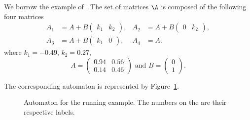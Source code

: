 
\begin{myexem}%
  \label{exem:run1}
  We borrow the example of \cite[]{philippe2016stability}.
  The set of matrices $\A$ is composed of the following four matrices
  \begin{align*}
    A_1 & = A+B
    \begin{pmatrix}
      k_1 & k_2
    \end{pmatrix},&
    A_2 & = A+B
    \begin{pmatrix}
      0 & k_2
    \end{pmatrix},\\
    A_3 & = A+B
    \begin{pmatrix}
      k_1 & 0
    \end{pmatrix},&
    A_4 & = A.
  \end{align*}
  where $k_1 = -0.49$, $k_2 = 0.27$,
  \[
    A =
    \begin{pmatrix}
      0.94 & 0.56\\
      0.14 & 0.46
    \end{pmatrix} \text{ and }
    B =
    \begin{pmatrix}
      0\\
      1
    \end{pmatrix}.
  \]

  The corresponding automaton is represented by Figure~\ref{fig:run}.

  \begin{figure}[!ht]
    \centering
     \caption{Automaton for the running example.
     The numbers on the \arcs{} are their respective labels.
     }
     \label{fig:run}
  \end{figure}
\end{myexem}
